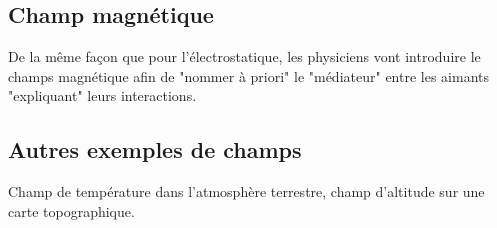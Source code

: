 \subsection{Champ magnétique}

De la même façon que pour l'électrostatique, les physiciens vont introduire le champs magnétique afin de "nommer à priori" le "médiateur" entre les aimants "expliquant" leurs interactions.

\subsection{Autres exemples de champs}

Champ de température dans l'atmosphère terrestre, champ d'altitude sur une carte topographique.

